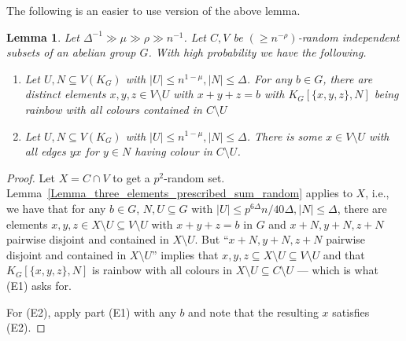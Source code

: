 \documentclass[a4paper,11pt,hidelinks]{amsart}
\newtheorem{lemma}[theorem]{Lemma}
\theoremstyle{definition}
\begin{document}
The following is an easier to use version of the above lemma.
\begin{lemma}\label{Lemma_neighbourhood_prescribed_sum_random}
Let $\Delta^{-1} \gg \mu \gg \rho\gg n^{-1}$.
Let $C,V$ be $(\geq n^{-\rho})$-random independent subsets of an abelian group $G$. With high probability we have the following. 
\begin{enumerate}[(E1)]
\item Let $U,N\subseteq V(K_G)$ with $|U|\leq n^{1-\mu}, |N|\leq \Delta$. For any $b\in G$, there are distinct elements $x,y,z\in V\setminus U$ with $x+y+z=b$ with $K_G[\{x,y,z\}, N]$ being rainbow with all colours contained in $C\setminus U$
\item Let $U,N\subseteq V(K_G)$ with $|U|\leq n^{1-\mu}, |N|\leq \Delta$. There is some $x\in V\setminus U$ with all edges $yx$ for $y\in N$ having colour in $C\setminus U$.\end{enumerate}
\end{lemma}
\begin{proof}
Let $X=C\cap V$ to get a $p^2$-random set. Lemma~\ref{Lemma_three_elements_prescribed_sum_random} applies to $X$, i.e., we have that for any $b\in G$, $N,U\subseteq G$ with $|U|\leq p^{6\Delta} n/40\Delta, |N|\leq \Delta$, there are elements $x,y,z\in X\setminus U\subseteq V\setminus U$ with $x+y+z=b$ in $G$ and $x+N, y+N, z+N$ pairwise disjoint and contained in $X\setminus U$. But ``$x+N, y+N, z+N$ pairwise disjoint and contained in $X\setminus U$'' implies that $x,y,z\subseteq X\setminus U\subseteq V\setminus U$ and that $K_G[\{x,y,z\}, N]$ is rainbow with all colours in $X\setminus U\subseteq C\setminus U$ --- which is what (E1) asks for. 

For (E2), apply part (E1) with any $b$ and note that the resulting $x$ satisfies (E2).
\end{proof}
\end{document}
